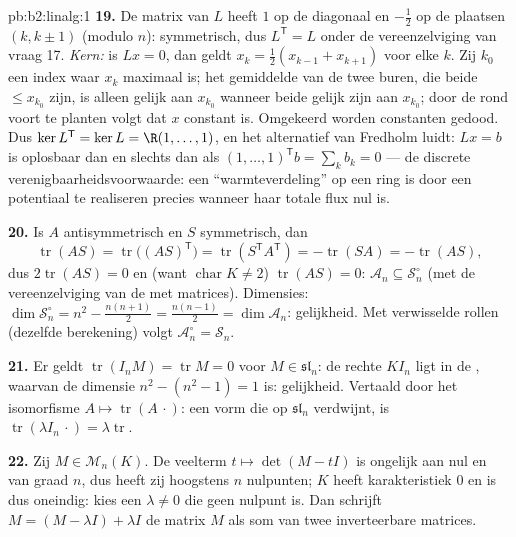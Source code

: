 \begin{solution}{pb:b2:linalg:1}
\textbf{19.} De matrix van $L$ heeft $1$ op de diagonaal en
$-\frac12$ op de plaatsen $(k, k\pm1)$ (modulo $n$): symmetrisch,
dus $L^{\mathsf T} = L$ onder de vereenzelviging van vraag 17.
\emph{Kern:} is $Lx = 0$, dan geldt $x_k = \frac12(x_{k-1} +
x_{k+1})$ voor elke $k$. Zij $k_0$ een index waar $x_k$ maximaal
is; het gemiddelde van de twee buren, die beide $\leq x_{k_0}$
zijn, is alleen gelijk aan $x_{k_0}$ wanneer beide gelijk zijn aan
$x_{k_0}$; door de  rond voort te planten volgt dat $x$
constant is. Omgekeerd worden constanten gedood. Dus $\ker
L^{\mathsf T} = \ker L = \R(1, \dots, 1)$, en het alternatief van
Fredholm luidt: $Lx = b$ is oplosbaar dan en slechts dan als
$(1,\dots,1)^{\mathsf T} b = \sum_k b_k = 0$ --- de discrete
verenigbaarheidsvoorwaarde: een ``warmteverdeling'' op een ring is
door een potentiaal te realiseren precies wanneer haar totale flux
nul is.

\textbf{20.} Is $A$ antisymmetrisch en $S$ symmetrisch, dan
\[
\operatorname{tr}(AS) = \operatorname{tr}\bigl((AS)^{\mathsf
T}\bigr) = \operatorname{tr}(S^{\mathsf T}A^{\mathsf T}) =
-\operatorname{tr}(SA) = -\operatorname{tr}(AS),
\]
dus $2\operatorname{tr}(AS) = 0$ en (want $\operatorname{char} K
\neq 2$) $\operatorname{tr}(AS) = 0$: $\mathcal{A}_n \subseteq
\mathcal{S}_n^\circ$ (met de vereenzelviging van de 
met matrices). Dimensies: $\dim\mathcal{S}_n^\circ = n^2 -
\frac{n(n+1)}2 = \frac{n(n-1)}2 = \dim\mathcal{A}_n$: gelijkheid.
Met verwisselde rollen (dezelfde berekening) volgt
$\mathcal{A}_n^\circ = \mathcal{S}_n$.

\textbf{21.} Er geldt $\operatorname{tr}(I_nM) = \operatorname{tr}
M = 0$ voor $M \in \mathfrak{sl}_n$: de rechte $KI_n$ ligt in de
, waarvan de dimensie $n^2 - (n^2 - 1) = 1$ is:
gelijkheid. Vertaald door het isomorfisme $A \mapsto
\operatorname{tr}(A\,\cdot)$: een vorm die op $\mathfrak{sl}_n$
verdwijnt, is $\operatorname{tr}(\lambda I_n\,\cdot) =
\lambda\operatorname{tr}$.

\textbf{22.} Zij $M \in \mathcal{M}_n(K)$. De veelterm $t \mapsto
\det(M - tI)$ is ongelijk aan nul en van graad $n$, dus heeft zij
hoogstens $n$ nulpunten; $K$ heeft karakteristiek $0$ en is dus
oneindig: kies een $\lambda \neq 0$ die geen nulpunt is. Dan
schrijft $M = (M - \lambda I) + \lambda I$ de matrix $M$ als som
van twee inverteerbare matrices.


\end{solution}
